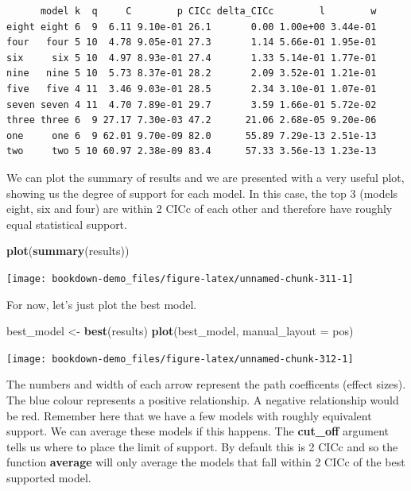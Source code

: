 \documentclass[
]{book}
\newenvironment{Shaded}{\begin{snugshade}}{\end{snugshade}}
\newcommand{\DataTypeTok}[1]{\textcolor[rgb]{0.13,0.29,0.53}{#1}}
\newcommand{\KeywordTok}[1]{\textcolor[rgb]{0.13,0.29,0.53}{\textbf{#1}}}
\newcommand{\NormalTok}[1]{#1}
\newcommand{\StringTok}[1]{\textcolor[rgb]{0.31,0.60,0.02}{#1}}
\begin{document}
\begin{verbatim}
      model k  q     C        p CICc delta_CICc        l        w
eight eight 6  9  6.11 9.10e-01 26.1       0.00 1.00e+00 3.44e-01
four   four 5 10  4.78 9.05e-01 27.3       1.14 5.66e-01 1.95e-01
six     six 5 10  4.97 8.93e-01 27.4       1.33 5.14e-01 1.77e-01
nine   nine 5 10  5.73 8.37e-01 28.2       2.09 3.52e-01 1.21e-01
five   five 4 11  3.46 9.03e-01 28.5       2.34 3.10e-01 1.07e-01
seven seven 4 11  4.70 7.89e-01 29.7       3.59 1.66e-01 5.72e-02
three three 6  9 27.17 7.30e-03 47.2      21.06 2.68e-05 9.20e-06
one     one 6  9 62.01 9.70e-09 82.0      55.89 7.29e-13 2.51e-13
two     two 5 10 60.97 2.38e-09 83.4      57.33 3.56e-13 1.23e-13
\end{verbatim}

We can plot the summary of results and we are presented with a very useful plot, showing us the degree of support for each model. In this case, the top 3 (models eight, six and four) are within 2 CICc of each other and therefore have roughly equal statistical support.

\begin{Shaded}
\begin{Highlighting}[]
\KeywordTok{plot}\NormalTok{(}\KeywordTok{summary}\NormalTok{(results))}
\end{Highlighting}
\end{Shaded}

\begin{center}\texttt{[image: bookdown-demo\_files/figure-latex/unnamed-chunk-311-1]} \end{center}

For now, let's just plot the best model.

\begin{Shaded}
\begin{Highlighting}[]
\NormalTok{best\_model \textless{}{-}}\StringTok{ }\KeywordTok{best}\NormalTok{(results)}
\KeywordTok{plot}\NormalTok{(best\_model, }\DataTypeTok{manual\_layout =}\NormalTok{ pos)}
\end{Highlighting}
\end{Shaded}

\begin{center}\texttt{[image: bookdown-demo\_files/figure-latex/unnamed-chunk-312-1]} \end{center}

The numbers and width of each arrow represent the path coefficents (effect sizes). The blue colour represents a positive relationship. A negative relationship would be red. Remember here that we have a few models with roughly equivalent support. We can average these models if this happens. The \textbf{cut\_off} argument tells us where to place the limit of support. By default this is 2 CICc and so the function \textbf{average} will only average the models that fall within 2 CICc of the best supported model.
\end{document}
